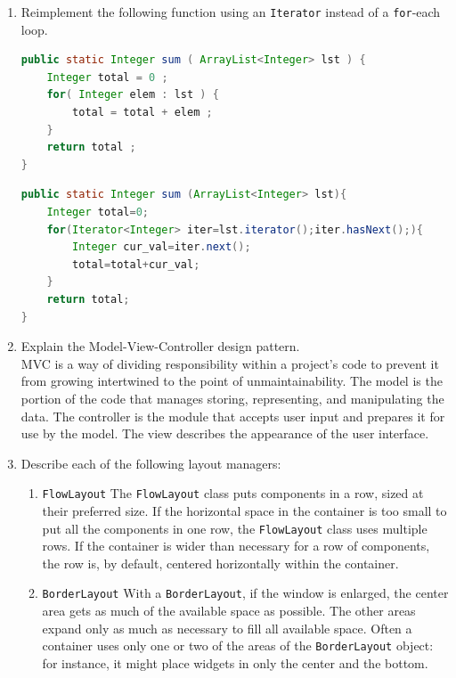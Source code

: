 \documentclass[11pt]{article}
\newenvironment{answer}{\large\lstset{basicstyle=\tiny\ttfamily}\color{white} }{}
\newenvironment{answer}{\large\lstset{basicstyle=\large\ttfamily}\color{red} }{}
\begin{document}
\begin{enumerate}
\vspace{24pt}
\item Reimplement the following function using an \texttt{Iterator} instead of a \texttt{for}-each loop.
\begin{lstlisting}[language=java]
public static Integer sum ( ArrayList<Integer> lst ) {
	Integer total = 0 ;
	for( Integer elem : lst ) {
		total = total + elem ;
	}
	return total ;
}
\end{lstlisting}
\begin{answer}
\begin{lstlisting}[language=java]
public static Integer sum (ArrayList<Integer> lst){
	Integer total=0;
	for(Iterator<Integer> iter=lst.iterator();iter.hasNext();){
		Integer cur_val=iter.next(); 
		total=total+cur_val;
	}
	return total;
}
\end{lstlisting}
\end{answer}


\vspace{24pt}
\item Explain the Model-View-Controller design pattern. \\
\begin{answer}
MVC is a way of dividing responsibility within a project's code to prevent it from growing intertwined to the point of unmaintainability.
The model is the portion of the code that manages storing, representing, and manipulating the data.
The controller is the module that accepts user input and prepares it for use by the model.
The view describes the appearance of the user interface.
\end{answer}


\newpage
\item Describe each of the following layout managers:
\begin{enumerate}

\item \texttt{FlowLayout}
\begin{answer}
The \texttt{FlowLayout} class puts components in a row, sized at their preferred size. If the horizontal space in the container is too small to put all the components in one row, the \texttt{FlowLayout} class uses multiple rows. If the container is wider than necessary for a row of components, the row is, by default, centered horizontally within the container. \end{answer}

\item \texttt{BorderLayout}
\begin{answer}
With a \texttt{BorderLayout}, if the window is enlarged, the center area gets as much of the available space as possible. The other areas expand only as much as necessary to fill all available space. Often a container uses only one or two of the areas of the \texttt{BorderLayout} object: for instance, it might place widgets in only the center and the bottom. \end{answer}


\end{enumerate}
\end{enumerate}
\end{document}
